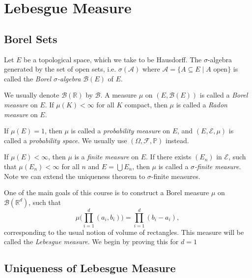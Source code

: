 \documentclass[12pt]{article}
\begin{document}
\newpage

\section{Lebesgue Measure}
\label{sec:lebesgue}

\subsection{Borel Sets}
\label{sub:borel_sets}

Let $E$ be a topological space, which we take to be Hausdorff. The $\sigma$-algebra generated by the set of open sets, i.e. $\sigma(\mathcal{A})$ where $\mathcal{A} = \{A \subseteq E \mid A \text{ open}\}$ is called the \emph{Borel $\sigma$-algebra} $\mathcal{B}(E)$ of $E$.

We usually denote $\mathcal{B}(\mathbb{R})$ by $\mathcal{B}$. A measure $\mu$ on $(E, \mathcal{B}(E))$ is called a \emph{Borel measure} on $E$. If $\mu(K) < \infty$ for all $K$ compact, then $\mu$ is called a \emph{Radon measure} on $E$.

If $\mu(E) = 1$, then $\mu$ is called a \emph{probability measure} on $E$, and $(E, \mathcal{E}, \mu)$ is called a \emph{probability space}. We usually use $(\Omega, \mathcal{F}, \mathbb{P})$ instead.

If $\mu(E) < \infty$, then $\mu$ is a \emph{finite measure} on $E$. If there exists $(E_n)$ in $\mathcal{E}$, such that $\mu(E_n) < \infty$ for all $n$ and $E = \bigcup E_n$, then $\mu$ is called a $\sigma$\emph{-finite measure}. Note we can extend the uniqueness theorem to $\sigma$-finite measures.


One of the main goals of this course is to construct a Borel measure $\mu$ on $\mathcal{B}(\mathbb{R}^{d})$, such that
\[
\mu \Biggl( \prod_{i=1}^{d} (a_i, b_i) \Biggr) = \prod_{i = 1}^{d}(b_i - a_i),
\]
corresponding to the usual notion of volume of rectangles. This measure will be called the \emph{Lebesgue measure}. We begin by proving this for $d = 1$

\subsection{Uniqueness of Lebesgue Measure}
\label{sub:unique_lebesgue}
\end{document}
